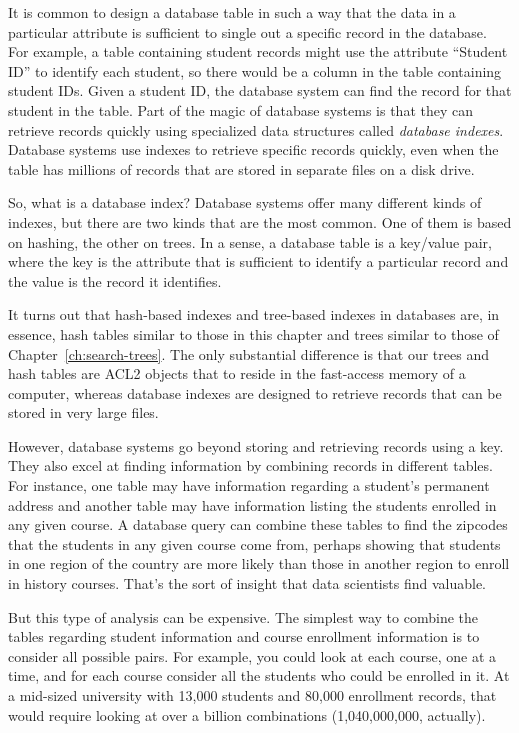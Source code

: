 It is common to design a database table in such a way that the
data in a particular attribute is sufficient
to single out a specific record in the database.
For example, a table containing student records might use the attribute
``Student ID'' to identify each student, so there would be
a column in the table containing student IDs.
Given a student ID, the
database system can find the record for that student in the
table. Part of the magic of database systems is that they can retrieve
records quickly using specialized data
structures called \emph{database indexes}.
Database systems use indexes to retrieve specific records quickly,
even when the table has millions of records that are stored
in separate files on a disk drive.

So, what is a database index? Database systems
offer many different kinds of indexes, but there are two kinds that are
the most common. One of them is based on hashing, the other on trees.
In a sense, a database
table is a key/value pair, where the key is the attribute that is
sufficient to identify a particular record and the value is the record
it identifies.

It turns out that hash-based indexes and tree-based indexes
in databases are,
in essence, hash tables similar to those in this chapter
and trees similar to those of Chapter~\ref{ch:search-trees}.
The only substantial difference
is that our trees and hash tables are ACL2 objects that
to reside in the fast-access memory of a computer,
whereas database indexes are designed to retrieve records
that can be stored in very large files.

However, database systems go beyond storing and retrieving records
using a key. They also excel at finding information by combining
records in different tables. For instance, one table may have
information regarding a student's permanent address and another table
may have information listing the students enrolled in any given course.
A database query can combine these tables to find the zipcodes that
the students in any given course come from, perhaps showing that students in one
region of the country are more likely than those in another region to
enroll in history courses. That's the sort of insight that
data scientists find valuable.

But this type of analysis can be expensive. The simplest
way to combine the tables regarding student information and course
enrollment information is to consider all possible pairs. For example,
you could look at each course, one at a time, and for each course consider
all the students who could be enrolled in it. At a mid-sized university
with 13,000 students and 80,000 enrollment records, that would require
looking at over a billion combinations (1,040,000,000, actually).

